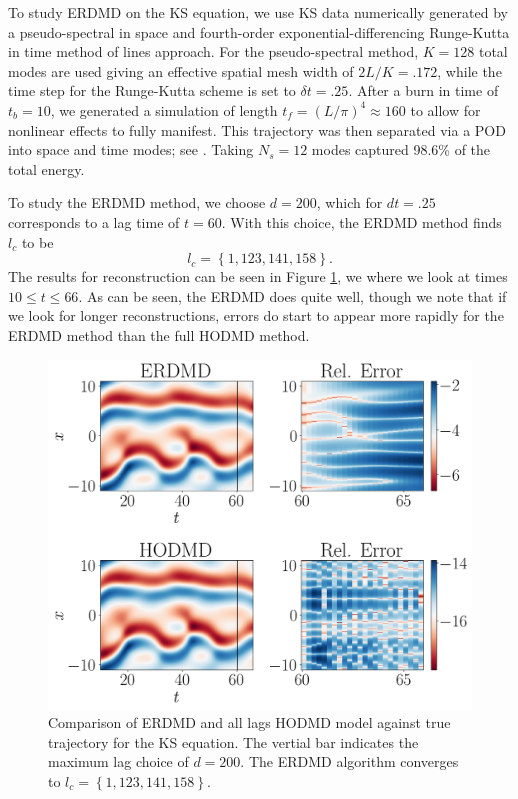\documentclass[a4paper,11pt]{article}
\begin{document}
To study ERDMD on the KS equation, we use KS data numerically generated by a pseudo-spectral in space and fourth-order exponential-differencing Runge-Kutta in time method \cite{kassam} of lines approach.  For the pseudo-spectral method, $K=128$ total modes are used giving an effective spatial mesh width of $2L/K = .172$, while the time step for the Runge-Kutta scheme is set to $\delta t = .25$.  After a burn in time of $t_{b}=10$, we generated a simulation of length $t_{f} = \left(L/\pi\right)^{4}\approx 160$ to allow for nonlinear effects to fully manifest.  This trajectory was then separated via a POD into space and time modes; see \cite{berkooz}.  Taking $N_{s}=12$ modes captured 98.6\% of the total energy.  

To study the ERDMD method, we choose $d=200$, which for $dt=.25$ corresponds to a lag time of $t=60$.  With this choice, the ERDMD method finds $l_{c}$ to be 
\[
l_{c}=\left\{1, 123, 141, 158\right\}.
\]
The results for reconstruction can be seen in Figure \ref{fig:ks_compare_d_200}, we where we look at times $10\leq t \leq 66$.  As can be seen, the ERDMD does quite well, though we note that if we look for longer reconstructions, errors do start to appear more rapidly for the ERDMD method than the full HODMD method.  
\begin{figure}[!h]
\centering
\includegraphics[width=1\textwidth]{ks_dynamics_compare}
\caption{Comparison of ERDMD and all lags HODMD model against true trajectory for the KS equation.  The vertial bar indicates the maximum lag choice of $d=200$. The ERDMD algorithm converges to $l_{c}=\left\{1, 123, 141, 158\right\}$.}
\label{fig:ks_compare_d_200}
\end{figure} 
 
\end{document}
